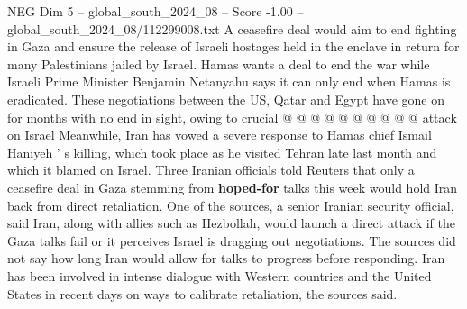 \begin{textsample}{NEG Dim 5 – global\_south\_2024\_08 – Score -1.00 – global\_south\_2024\_08/112299008.txt}
A ceasefire deal would aim to end fighting in Gaza and ensure the release of Israeli hostages held in the enclave in return for many Palestinians jailed by Israel.
Hamas wants a deal to end the war while Israeli Prime Minister Benjamin Netanyahu says it can only end when Hamas is eradicated.
These negotiations between the US, Qatar and Egypt have gone on for months with no end in sight, owing to crucial @ @ @ @ @ @ @ @ @ @ attack on Israel Meanwhile, Iran has vowed a severe response to Hamas chief Ismail Haniyeh ' s killing, which took place as he visited Tehran late last month and which it blamed on Israel.
Three Iranian officials told Reuters that only a ceasefire deal in Gaza stemming from \textbf{hoped-for} talks this week would hold Iran back from direct retaliation.
One of the sources, a senior Iranian security official, said Iran, along with allies such as Hezbollah, would launch a direct attack if the Gaza talks fail or it perceives Israel is dragging out negotiations.
The sources did not say how long Iran would allow for talks to progress before responding.
Iran has been involved in intense dialogue with Western countries and the United States in recent days on ways to calibrate retaliation, the sources said.

\end{textsample}
